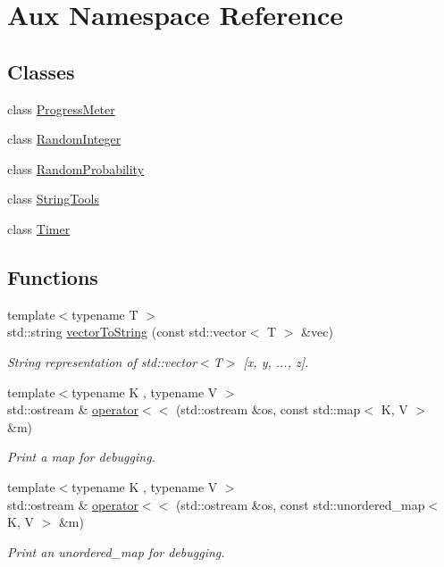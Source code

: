 \hypertarget{namespace_aux}{\section{Aux Namespace Reference}
\label{namespace_aux}
}
\subsection*{Classes}
\begin{DoxyCompactItemize}
\item 
class \hyperlink{class_aux_1_1_progress_meter}{Progress\-Meter}
\item 
class \hyperlink{class_aux_1_1_random_integer}{Random\-Integer}
\item 
class \hyperlink{class_aux_1_1_random_probability}{Random\-Probability}
\item 
class \hyperlink{class_aux_1_1_string_tools}{String\-Tools}
\item 
class \hyperlink{class_aux_1_1_timer}{Timer}
\end{DoxyCompactItemize}
\subsection*{Functions}
\begin{DoxyCompactItemize}
\item 
{\footnotesize template$<$typename T $>$ }\\std\-::string \hyperlink{namespace_aux_ab4521a43e56fafd63f5621cc646c2ed5}{vector\-To\-String} (const std\-::vector$<$ T $>$ \&vec)
\begin{DoxyCompactList}\small\item\em String representation of std\-::vector$<$\-T$>$ \mbox{[}x, y, ..., z\mbox{]}. \end{DoxyCompactList}\item 
{\footnotesize template$<$typename K , typename V $>$ }\\std\-::ostream \& \hyperlink{namespace_aux_aca2933c9253bfd8057d3f85b45dc0134}{operator$<$$<$} (std\-::ostream \&os, const std\-::map$<$ K, V $>$ \&m)
\begin{DoxyCompactList}\small\item\em Print a map for debugging. \end{DoxyCompactList}\item 
{\footnotesize template$<$typename K , typename V $>$ }\\std\-::ostream \& \hyperlink{namespace_aux_a4822f1875a9abce8115391bb003ba08b}{operator$<$$<$} (std\-::ostream \&os, const std\-::unordered\-\_\-map$<$ K, V $>$ \&m)
\begin{DoxyCompactList}\small\item\em Print an unordered\-\_\-map for debugging. \end{DoxyCompactList}\end{DoxyCompactItemize}



